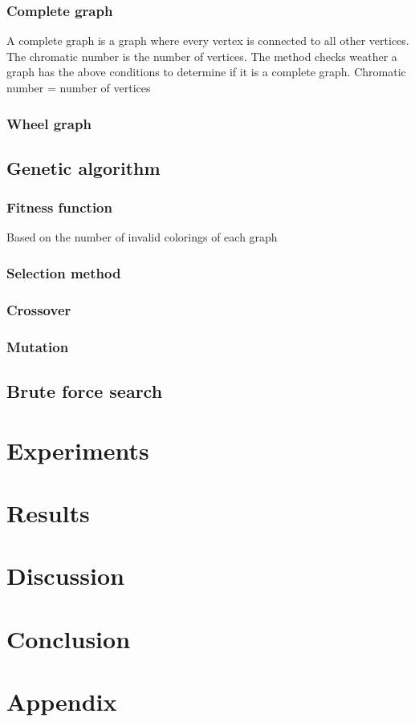 \documentclass[a4paper]{report}
\begin{document}
			\subsection{Complete graph}
			A complete graph is a graph where every vertex is connected to all other vertices. The chromatic number is the number of vertices. The method checks weather a graph has the above conditions to determine if it is a complete graph.
			Chromatic number = number of vertices
			\subsection{Wheel graph}
			
		\section{Genetic algorithm}
			\subsection{Fitness function}
			Based on the number of invalid colorings of each graph
			\subsection{Selection method}
			\subsection{Crossover}
			\subsection{Mutation}
		
		\section{Brute force search}
		
		
	\chapter{Experiments}
		
	\chapter{Results}
	
	\chapter{Discussion}
	
	\chapter{Conclusion}
	
	
	
	
	
	\appendix
	\chapter*{Appendix}
\end{document}
